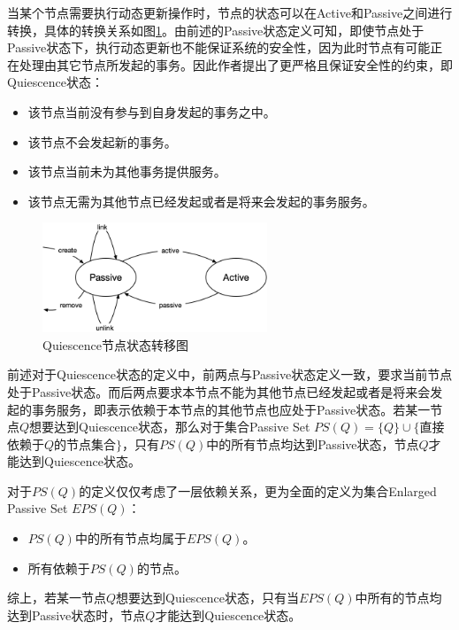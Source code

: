 \documentclass[macfonts,master]{njuthesis}
\begin{document}
当某个节点需要执行动态更新操作时，节点的状态可以在Active和Passive之间进行转换，具体的转换关系如图\ref{fig:state_shift}。由前述的Passive状态定义可知，即使节点处于Passive状态下，执行动态更新也不能保证系统的安全性，因为此时节点有可能正在处理由其它节点所发起的事务。因此作者提出了更严格且保证安全性的约束，即Quiescence状态：

\begin{itemize}
	\item 该节点当前没有参与到自身发起的事务之中。
	\item 该节点不会发起新的事务。
	\item 该节点当前未为其他事务提供服务。
	\item 该节点无需为其他节点已经发起或者是将来会发起的事务服务。
\end{itemize}

\begin{figure}[!htbp]
  \centering
  \includegraphics[width= 0.6\textwidth]{image/state_shift.png}
  \caption{Quiescence节点状态转移图}
  \label{fig:state_shift}
\end{figure}

前述对于Quiescence状态的定义中，前两点与Passive状态定义一致，要求当前节点处于Passive状态。而后两点要求本节点不能为其他节点已经发起或者是将来会发起的事务服务，即表示依赖于本节点的其他节点也应处于Passive状态。若某一节点$Q$想要达到Quiescence状态，那么对于集合Passive Set $PS (Q) =\{Q\}\cup\{$直接依赖于$Q$的节点集合$\}$，只有$PS (Q) $中的所有节点均达到Passive状态，节点$Q$才能达到Quiescence状态。

对于$PS (Q) $的定义仅仅考虑了一层依赖关系，更为全面的定义为集合Enlarged Passive Set $EPS (Q) $：

\begin{itemize}
	\item $PS (Q) $中的所有节点均属于$EPS (Q) $。
	\item 所有依赖于$PS (Q) $的节点。
\end{itemize}

综上，若某一节点$Q$想要达到Quiescence状态，只有当$EPS (Q) $中所有的节点均达到Passive状态时，节点$Q$才能达到Quiescence状态。
\end{document}
